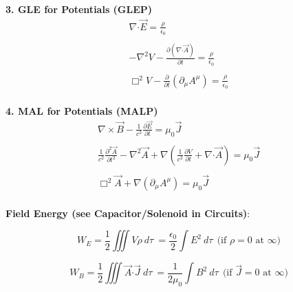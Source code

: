 \documentclass[12pt]{article}
\newcommand*{\dotP}{\boldsymbol \cdot}		%
\begin{document}
\vspace{20pt}
\begin{minipage}[t]{0.48\textwidth}
	\textbf{3. GLE for Potentials (GLEP)}
	\begin{gather*}
		\nabla \dotP \vec{E} = \frac{\rho}{\epsilon_0} \\ \\
		- \nabla^2 V - \frac{\partial (\nabla \dotP \vec{A})}{\partial t} = \frac{\rho}{\epsilon_0} \\ \\
		\boxed{ \Box^2 V - \frac{\partial}{\partial t} ( \partial_\mu A^\mu ) = \frac{\rho}{\epsilon_0} }\\
	\end{gather*}
\end{minipage} 
\hspace{0\textwidth}
\begin{minipage}[t]{0.48\textwidth}
	\textbf{4. MAL for Potentials (MALP)}
	\begin{gather*}
		\nabla \times \vec{B} - \frac{1}{c^2} \frac{\partial \vec{E}}{\partial t} = \mu_0 \vec{J} \\ \\
		\frac{1}{c^2} \frac{\partial^2 \vec{A}}{\partial t^2} - \nabla^2 \vec{A} 
			+ \nabla \left ( \frac{1}{c^2} \frac{\partial V}{\partial t} + \nabla \dotP \vec{A} \right )
			= \mu_0 \vec{J} \\ \\
		\boxed{ \Box^2 \vec{A} + \nabla ( \partial_\mu A^\mu )
			= \mu_0 \vec{J} } \\
	\end{gather*} 
\end{minipage} 

\vspace{15pt} \noindent
\textbf{Field Energy (see Capacitor/Solenoid in Circuits)}:

\vspace{10pt}
\begin{minipage}{.49\textwidth}
	\[ \boxed{W_E = \frac{1}{2} \iiint V \rho \ d\tau} 
		\ = \frac{\epsilon_0}{2} \int E^2 \ d\tau 
		\ \ \text{(if \(\rho=0\) at \(\infty\))} \]
\end{minipage}
\begin{minipage}{.49\textwidth}
	\[ \boxed{ W_B = \frac{1}{2} \iiint \vec{A} \dotP \vec{J} \ d\tau }
		\ = \frac{1}{2 \mu_0} \int B^2 \ d\tau 
		\ \ \text{(if \(\vec{J}=0\) at \(\infty\))} \]
\end{minipage}
\end{document}
